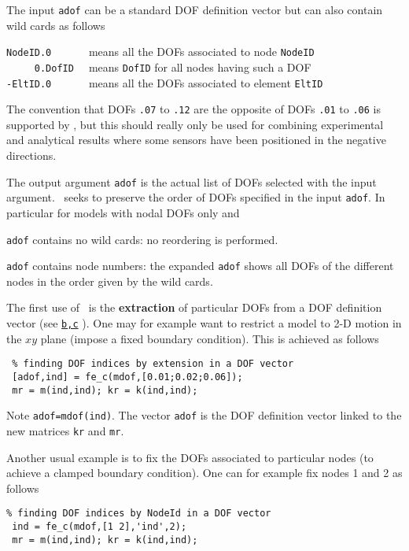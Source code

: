\vs The input {\tt adof} can be a standard DOF definition vector but can also contain wild cards as follows

\lvs\noindent
{\tt NodeID.0\ \ \ \ \ \ }  means all the DOFs associated to node {\tt NodeID} \\
{\tt \hbox{\ \ \ \ \ }0.DofID\ \ } means {\tt DofID} for all nodes having such a DOF\\
{\tt -EltID.0\ \ \ \ \ \ } means all the DOFs associated to element {\tt  EltID}

\vs The convention that DOFs {\tt .07} to {\tt .12} are the opposite of DOFs {\tt .01} to {\tt .06} is supported by \fec, but this should really only be used for combining experimental and analytical results where some sensors have been positioned in the negative directions.

The output argument {\tt adof} is the actual list of DOFs selected with the input argument.  \fec\ seeks to preserve the order of DOFs specified in the input {\tt adof}.  In particular for models with nodal DOFs only and

\begin{Eitem}
   \item {\tt adof} contains no wild cards: no reordering is performed.
   \item {\tt adof} contains node numbers: the expanded {\tt adof} shows all DOFs of the different nodes in the order given by the wild cards.
\end{Eitem}

The first use of \fec\ is the {\bf extraction} of particular DOFs from a DOF definition vector (see \hyperlink{adof}{{\tt b,c}} ).
One may for example want to restrict a model to 2-D motion in the $xy$ plane (impose a fixed boundary condition). This is achieved as follows

\begin{verbatim}
 % finding DOF indices by extension in a DOF vector
 [adof,ind] = fe_c(mdof,[0.01;0.02;0.06]);
 mr = m(ind,ind); kr = k(ind,ind);
\end{verbatim}


Note {\tt adof=mdof(ind)}.  The vector {\tt adof} is the DOF definition vector linked to the new matrices {\tt kr} and {\tt mr}.

Another usual example is to fix the DOFs associated to particular nodes (to achieve a clamped boundary condition). One can for example fix nodes 1 and 2 as follows

\begin{verbatim}
% finding DOF indices by NodeId in a DOF vector
 ind = fe_c(mdof,[1 2],'ind',2);
 mr = m(ind,ind); kr = k(ind,ind);
\end{verbatim}


